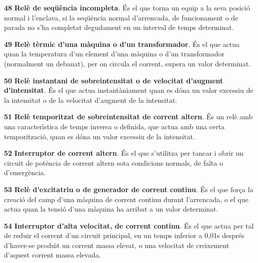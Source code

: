 \begin{multicols}{2}
\begin{list}{}
\item[\textbf{48}]  \textbf{Rel\`{e} de seq\"{u}\`{e}ncia
incompleta}. \'{E}s el que torna un equip a la seva posici\'{o} normal  i
l'enclava, si la seq\"{u}\`{e}ncia normal d'arrencada, de funcionament o de
parada no s'ha completat degudament en un interval de temps
determinat.

\item[\textbf{49}] 
\textbf{Rel\`{e} t\`{e}rmic d'una m\`{a}quina o d'un transformador}. \'{E}s el que
actua quan la temperatura d'un element d'una m\`{a}quina o d'un
transformador (normalment un debanat), per on circula el corrent,
supera un valor determinat.

\item[\textbf{50}]  \textbf{Rel\`{e} instantani de sobreintensitat o de velocitat d'augment
d'intensitat}. \'{E}s el que actua instant\`{a}niament quan es d\'{o}na un valor excessiu de la
intensitat o de la  velocitat d'augment de la intensitat.

\item[\textbf{51}] 
\textbf{Rel\`{e} temporitzat de sobreintensitat de corrent altern}. \'{E}s
un rel\`{e} amb una caracter\'{\i}stica de temps inversa o definida, que
actua amb una certa temporitzaci\'{o}, quan es d\'{o}na un valor excessiu de
la intensitat.

\item[\textbf{52}]  \textbf{Interruptor de corrent altern}. \'{E}s
 el que s'utilitza per tancar i obrir un circuit de pot\`{e}ncia de corrent altern sota condicions
normals, de falta o d'emerg\`{e}ncia.

\item[\textbf{53}] 
\textbf{Rel\`{e} d'excitatriu o de generador de corrent continu}. \'{E}s el
que for\c{c}a la creaci\'{o} del camp d'una m\`{a}quina de corrent continu
durant l'arrencada, o el que actua quan la tensi\'{o} d'una m\`{a}quina ha
arribat a un valor determinat.

\item[\textbf{54}] 
\textbf{Interruptor d'alta velocitat, de corrent continu}. \'{E}s el que
actua per tal de reduir el corrent d'un circuit principal, en un
temps inferior a 0,01\unit{s} despr\'{e}s d'haver-se produ\"{\i}t un corrent
massa elevat, o una velocitat de creixement d'aquest corrent massa
elevada.


\end{list}
\end{multicols}
